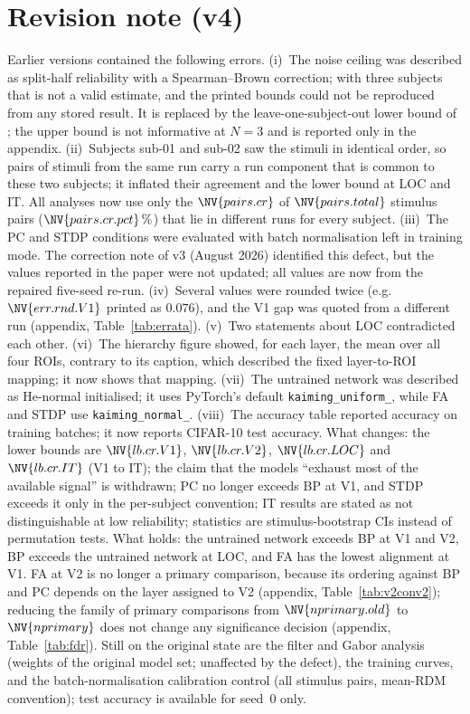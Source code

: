 \documentclass[10pt,twocolumn]{article}
\newcommand{\lb}[1]{\NV{lb.cr.#1}}
\begin{document}
\section*{Revision note (v4)}

\noindent Earlier versions contained the following errors. (i)~The noise ceiling was
described as split-half reliability with a Spearman--Brown correction; with three subjects
that is not a valid estimate, and the printed bounds could not be reproduced from any stored
result. It is replaced by the leave-one-subject-out lower bound of \citet{nili2014}; the upper
bound is not informative at $N=3$ and is reported only in the appendix. (ii)~Subjects sub-01
and sub-02 saw the stimuli in identical order, so pairs of stimuli from the same run carry a
run component that is common to these two subjects; it inflated their agreement and the lower
bound at LOC and IT. All analyses now use only the $\NV{pairs.cr}$ of $\NV{pairs.total}$
stimulus pairs ($\NV{pairs.cr.pct}\,\%$) that lie in different runs for every subject.
(iii)~The PC and STDP conditions were evaluated with batch normalisation left in training
mode. The correction note of v3 (August 2026) identified this defect, but the values
reported in the paper were not updated; all values are now from the repaired five-seed
re-run. (iv)~Several values were rounded twice (e.g.\ $\NV{err.rnd.V1}$ printed as $0.076$),
and the V1 gap was quoted from a different run (appendix, Table~\ref{tab:errata}). (v)~Two
statements about LOC contradicted each other. (vi)~The hierarchy figure showed, for each
layer, the mean over all four ROIs, contrary to its caption, which described the fixed
layer-to-ROI mapping; it now shows that mapping. (vii)~The untrained network was described as
He-normal initialised; it uses PyTorch's default \texttt{kaiming\_uniform\_}, while FA and
STDP use \texttt{kaiming\_normal\_}. (viii)~The accuracy table reported accuracy on training
batches; it now reports CIFAR-10 test accuracy. What changes: the lower bounds are
$\lb{V1}$, $\lb{V2}$, $\lb{LOC}$ and $\lb{IT}$ (V1 to IT); the claim that the models
``exhaust most of the available signal'' is withdrawn; PC no longer exceeds BP at V1, and
STDP exceeds it only in the per-subject convention; IT results are stated as not
distinguishable at low reliability; statistics are stimulus-bootstrap CIs instead of
permutation tests. What holds: the untrained network exceeds BP at V1 and V2, BP exceeds the
untrained network at LOC, and FA has the lowest alignment at V1. FA at V2 is no longer a primary comparison, because its ordering against BP and PC depends on the layer assigned to V2 (appendix, Table~\ref{tab:v2conv2}); reducing the family of primary comparisons from $\NV{nprimary.old}$ to $\NV{nprimary}$ does not change any significance decision (appendix, Table~\ref{tab:fdr}). Still on the original
state are the filter and Gabor analysis (weights of the original model set; unaffected by the
defect), the training curves, and the batch-normalisation calibration control (all stimulus
pairs, mean-RDM convention); test accuracy is available for seed~0 only.
\end{document}

